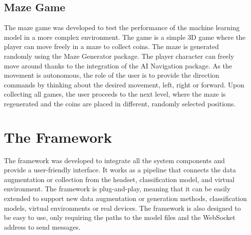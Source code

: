 \subsection*{Maze Game}
The maze game was developed to test the performance of the machine learning model in a more complex environment.
The game is a simple 3D game where the player can move freely in a maze to collect coins.
The maze is generated randomly using the Maze Generator package.
The player character can freely move around thanks to the integration of the AI Navigation package.
As the movement is autonomous, the role of the user is to provide the direction commands by thinking about the desired movement, left, right or forward.
Upon collecting all games, the user proceeds to the next level, where the maze is regenerated and the coins are placed in different, randomly selected positions.

\section{The Framework}
The framework was developed to integrate all the system components and provide a user-friendly interface.
It works as a pipeline that connects the data augmentation or collection from the headset, classification model, and virtual environment.
The framework is plug-and-play, meaning that it can be easily extended to support new data augmentation or generation methods, classification models, virtual environments or real devices.
The framework is also designed to be easy to use, only requiring the paths to the model files and the WebSocket address to send messages.

